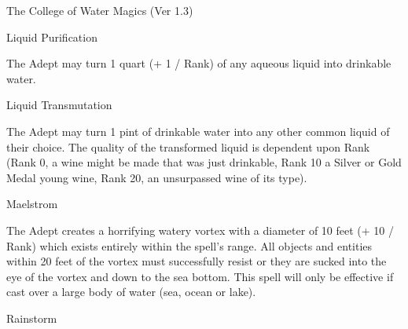 \begin{Chapter}{The College of Water Magics (Ver 1.3)}
\begin{spell}[S-5]{Liquid Purification}

\begin{effects}
The Adept may turn 1 quart (+ 1 / Rank) of any aqueous liquid into
drinkable water.
\end{effects}
\end{spell}

\begin{spell}[S-6]{Liquid Transmutation}

\begin{effects}
The Adept may turn 1 pint of drinkable water into any other common
liquid of their choice.  The quality of the transformed liquid is
dependent upon Rank (Rank 0, a wine might be made that was just
drinkable, Rank 10 a Silver or Gold Medal young wine, Rank 20, an
unsurpassed wine of its type).
\end{effects}
\end{spell}

\begin{spell}[S-7]{Maelstrom}

\begin{effects}
The Adept creates a horrifying watery vortex with a diameter of 10
feet (+ 10 / Rank) which exists entirely within the spell’s range.
All objects and entities within 20 feet of the vortex must
successfully resist or they are sucked into the eye of the vortex and
down to the sea bottom. This spell will only be effective if cast over
a large body of water (sea, ocean or lake).
\end{effects}
\end{spell}

\begin{spell}[S-8]{Rainstorm}


\end{spell}
\end{Chapter}
